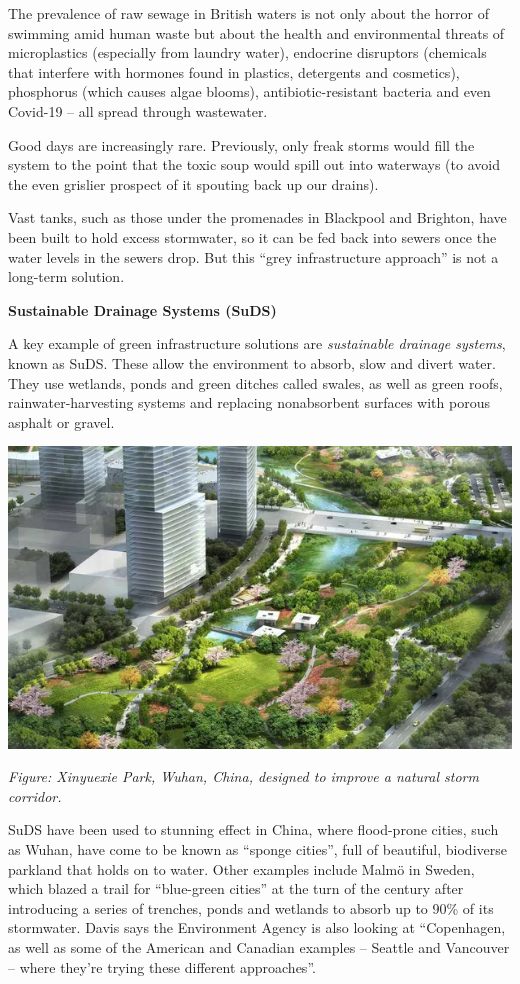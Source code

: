 \documentclass[
]{book}
\begin{document}
The prevalence of raw sewage in British waters is not only about the horror of swimming amid human waste but about the health and environmental threats of microplastics (especially from laundry water), endocrine disruptors (chemicals that interfere with hormones found in plastics, detergents and cosmetics), phosphorus (which causes algae blooms), antibiotic-resistant bacteria and even Covid-19 -- all spread through wastewater.

Good days are increasingly rare. Previously, only freak storms would fill the system to the point that the toxic soup would spill out into waterways (to avoid the even grislier prospect of it spouting back up our drains).

Vast tanks, such as those under the promenades in Blackpool and Brighton, have been built to hold excess stormwater, so it can be fed back into sewers once the water levels in the sewers drop. But this ``grey infrastructure approach'' is not a long-term solution.

\textbf{Sustainable Drainage Systems (SuDS)}

A key example of green infrastructure solutions are \emph{sustainable drainage systems}, known as SuDS. These allow the environment to absorb, slow and divert water. They use wetlands, ponds and green ditches called swales, as well as green roofs, rainwater-harvesting systems and replacing nonabsorbent surfaces with porous asphalt or gravel.

\includegraphics{fig/Wuhan-Storm_Corridor.png}

\emph{Figure: Xinyuexie Park, Wuhan, China, designed to improve a natural storm corridor.}

SuDS have been used to stunning effect in China, where flood-prone cities, such as Wuhan, have come to be known as ``sponge cities'', full of beautiful, biodiverse parkland that holds on to water. Other examples include Malmö in Sweden, which blazed a trail for ``blue-green cities'' at the turn of the century after introducing a series of trenches, ponds and wetlands to absorb up to 90\% of its stormwater. Davis says the Environment Agency is also looking at ``Copenhagen, as well as some of the American and Canadian examples -- Seattle and Vancouver -- where they're trying these different approaches''.
\end{document}
